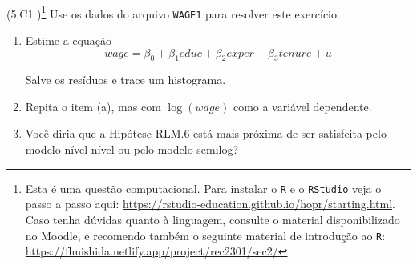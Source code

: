 \documentclass[12pt,letterpaper, onecolumn]{exam}
\begin{document}
\begin{questions}
\
\\


\question\qstar (5.C1 \citep{wooldridge2016})\footnote{Esta é uma questão computacional. Para instalar o \texttt{R} e o \texttt{RStudio} veja o passo a passo aqui: \href{https://rstudio-education.github.io/hopr/starting.html}{https://rstudio-education.github.io/hopr/starting.html}. Caso tenha dúvidas quanto à linguagem, consulte o material disponibilizado no Moodle, e recomendo também o seguinte material de introdução ao \texttt{R}: \href{https://fhnishida.netlify.app/project/rec2301/sec2/}{https://fhnishida.netlify.app/project/rec2301/sec2/} }
Use os dados do arquivo \texttt{WAGE1} para resolver este exercício.

    \begin{enumerate} [label = (\alph*)]
\item Estime a equação
    \[
    wage = \beta_0 + \beta_1 educ + \beta_2 exper + \beta_3 tenure + u
    \]

    Salve os resíduos e trace um histograma.
\item  Repita o item (a), mas com \(\log(wage)\) como a variável dependente.
\item  Você diria que a Hipótese RLM.6 está mais próxima de ser satisfeita pelo modelo nível-nível ou pelo modelo semilog?
    \end{enumerate}
    
\end{questions}
\newpage

\end{document}
